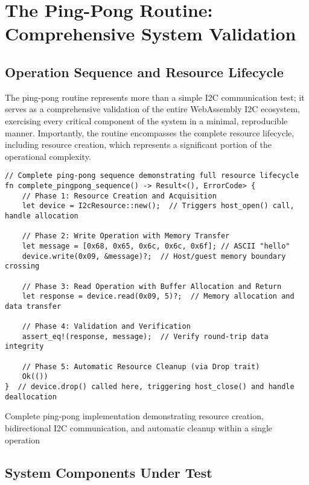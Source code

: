 \section{The Ping-Pong Routine: Comprehensive System Validation}
\label{sec:ping-pong-routine}

\subsection{Operation Sequence and Resource Lifecycle}

The ping-pong routine represents more than a simple I2C communication test; it serves as a comprehensive validation of the entire WebAssembly I2C ecosystem, exercising every critical component of the system in a minimal, reproducible manner. Importantly, the routine encompasses the complete resource lifecycle, including resource creation, which represents a significant portion of the operational complexity.

\begin{listing}[H]
\begin{verbatim}
// Complete ping-pong sequence demonstrating full resource lifecycle
fn complete_pingpong_sequence() -> Result<(), ErrorCode> {
    // Phase 1: Resource Creation and Acquisition
    let device = I2cResource::new();  // Triggers host_open() call, handle allocation
    
    // Phase 2: Write Operation with Memory Transfer
    let message = [0x68, 0x65, 0x6c, 0x6c, 0x6f]; // ASCII "hello"
    device.write(0x09, &message)?;  // Host/guest memory boundary crossing
    
    // Phase 3: Read Operation with Buffer Allocation and Return
    let response = device.read(0x09, 5)?;  // Memory allocation and data transfer
    
    // Phase 4: Validation and Verification
    assert_eq!(response, message);  // Verify round-trip data integrity
    
    // Phase 5: Automatic Resource Cleanup (via Drop trait)
    Ok(())
}  // device.drop() called here, triggering host_close() and handle deallocation
\end{verbatim}
\caption{Complete ping-pong implementation demonstrating resource creation, bidirectional I2C communication, and automatic cleanup within a single operation}
\label{lst:complete-pingpong}
\end{listing}

\subsection{System Components Under Test}

